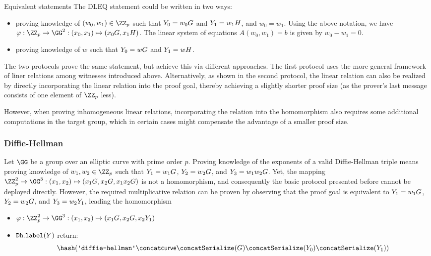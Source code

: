 \documentclass[11pt]{article}
\begin{document}
\begin{remark}{Equivalent statements}{}
  The DLEQ statement could be written in two ways:
  \begin{itemize}
    \item proving knowledge of $(w_0,w_1)\in\ZZ_p$ such that $Y_0=w_0G$ and $Y_1=w_1H$, and $w_0=w_1$.
  Using the above notation, we have $\varphi:\ZZ_p\to\GG^2:(x_0,x_1)\mapsto (x_0G,x_1H)$.
  The linear system of equations $A(w_0,w_1)=b$ is given by $w_0-w_1=0$.

  \item proving knowledge of $w$ such that $Y_0 = wG$ and $Y_1 = w H$.
  \end{itemize}
  The two protocols prove the same statement, but achieve this via different approaches.
  The first protocol uses the more general framework of liner relations among witnesses introduced above.
  Alternatively, as shown in the second protocol, the linear relation can also be realized by  directly incorporating the linear relation into the proof goal, thereby achieving a slightly shorter proof size (as the prover's last message consists of one element of $\ZZ_p$ less).

  However, when proving inhomogeneous linear relations, incorporating the relation into the homomorphism also requires some additional computations in the target group, which in certain cases might compensate the advantage of a smaller proof size.
\end{remark}


\subsubsection{Diffie-Hellman}
Let $\GG$ be a group over an elliptic curve with prime order $p$.
Proving knowledge of the exponents of a valid Diffie-Hellman triple means proving knowledge of $w_1,w_2\in\ZZ_p$ such that $Y_1=w_1G$, $Y_2=w_2G$, and $Y_3=w_1 w_2 G$.
Yet, the mapping $\ZZ_p^2\to\GG^3:(x_1,x_2)\mapsto (x_1G,x_2G,x_1x_2G)$ is not a homomorphism, and consequently the basic protocol presented before cannot be deployed directly.
However, the required multiplicative relation can be proven by observing that the proof goal is equivalent to $Y_1=w_1G$, $Y_2=w_2G$, and $Y_3=w_2Y_1$, leading the homomorphism

\begin{itemize}
  \item  $\varphi:\ZZ_p^2\to\GG^3:(x_1,x_2)\mapsto(x_1G,x_2G,x_2\statement_1)$
  \item $\texttt{Dh}.\texttt{label}(Y)$ return:
  \[
    \hash(\dhlabel \concat \curvectx \concat \serialize(G) \concat \serialize(\statement_0) \concat \serialize(\statement_1))
  \]
\end{itemize}
\end{document}
